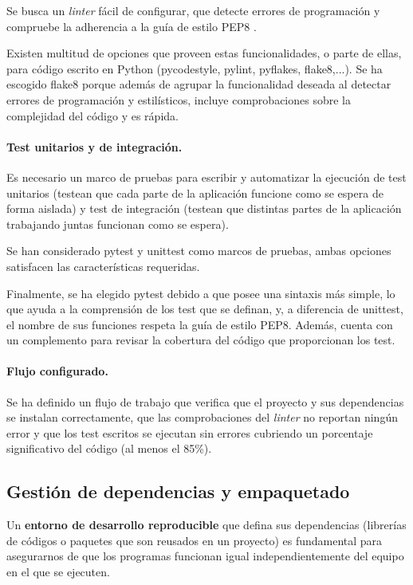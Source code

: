 Se busca un \textit{linter} fácil de configurar, que detecte errores de programación y compruebe la adherencia a la guía de estilo PEP8 \cite{pep8}.

Existen multitud de opciones que proveen estas funcionalidades, o parte de ellas, para código escrito en Python (pycodestyle, pylint, pyflakes, flake8,...). Se ha escogido flake8 porque además de agrupar la funcionalidad deseada al detectar errores de programación y estilísticos, incluye comprobaciones sobre la complejidad del código y es rápida.

\paragraph*{Test unitarios y de integración.}
\label{sec:tests}

Es necesario un marco de pruebas para escribir y automatizar la ejecución de test unitarios (testean que cada parte de la aplicación funcione como se espera de forma aislada) y test de integración (testean que distintas partes de la aplicación trabajando juntas funcionan como se espera).

Se han considerado pytest y unittest como marcos de pruebas, ambas opciones satisfacen las características requeridas.

Finalmente, se ha elegido pytest debido a que posee una sintaxis más simple, lo que ayuda a la comprensión de los test que se definan, y, a diferencia de unittest, el nombre de sus funciones respeta la guía de estilo PEP8. Además, cuenta con un complemento para revisar la cobertura del código que proporcionan los test.

\paragraph*{Flujo configurado.}

Se ha definido un flujo de trabajo que verifica que el proyecto y sus dependencias se instalan correctamente, que las comprobaciones del \textit{linter} no reportan ningún error y que los test escritos se ejecutan sin errores cubriendo un porcentaje significativo del código (al menos el 85\%).

\subsection{Gestión de dependencias y empaquetado}
\label{sec:poetry}

Un \textbf{entorno de desarrollo reproducible} que defina sus dependencias
(librerías de códigos o paquetes que son reusados en un proyecto) es fundamental para asegurarnos de que los programas funcionan igual independientemente del equipo en el que se ejecuten.

